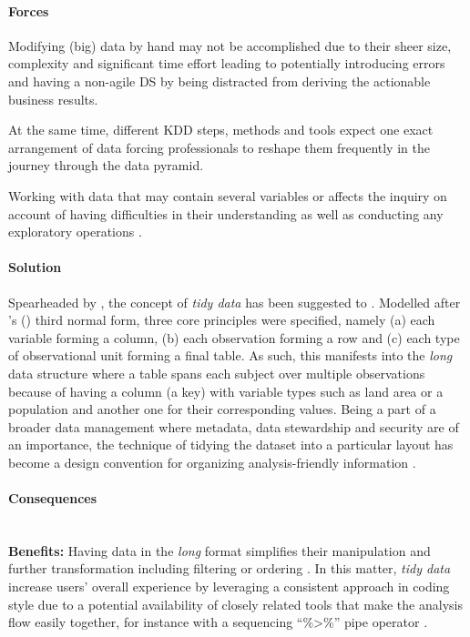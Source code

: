 \paragraph*{Forces}
\begin{compactitem}
  \item Modifying (big) data by hand may not be accomplished due to their sheer size, complexity and significant time effort leading to potentially introducing errors and having a non-agile \ac{DS} by being distracted from deriving the actionable business results.
  \item At the same time, different \ac{KDD} steps, methods and tools expect one exact arrangement of data forcing professionals to reshape them frequently in the journey through the data pyramid. 
  \item Working with data that may contain several variables  or  affects the inquiry on account of having difficulties in their understanding as well as conducting any exploratory operations \parencite[5]{TidyDataWickham2014}.
\end{compactitem}

\paragraph*{Solution}
Spearheaded by \textcite[5]{TidyDataWickham2014}, the concept of \emph{tidy data} has been suggested to .
Modelled after \citeauthor{Codd:1970:RMD:362384.362685}'s (\citeyear{Codd:1970:RMD:362384.362685}) third normal form, three core principles were specified, namely (a) each variable forming a column, (b) each observation forming a row and (c) each type of observational unit forming a final table.
As such, this manifests into the \emph{long} data structure where a table spans each subject over multiple observations because of having a column (a key) with variable types such as land area or a population and another one for their corresponding values. 
Being a part of a broader data management where metadata, data stewardship and security are of an importance, the technique of tidying the dataset into a particular layout has become a design convention for organizing analysis-friendly information \parencites{WilsonGred2017}{CMACanada2003}{DataBoK2017}. 

\paragraph*{Consequences} ~\\
{\hspace*{14.5pt} \textbf{Benefits:} \hspace*{-5.5pt} }
Having data in the \emph{long} format simplifies their manipulation and further transformation including filtering or ordering \parencite{NinaBookR2014}.
In this matter, \emph{tidy data} increase users' overall experience by leveraging a consistent approach in coding style due to a potential availability of closely related tools that make the analysis flow easily together, for instance with a sequencing \enquote{\%>\%} pipe operator \parencites{Boehmke2016DataR}{GarrettGrolemund2017RData}.

